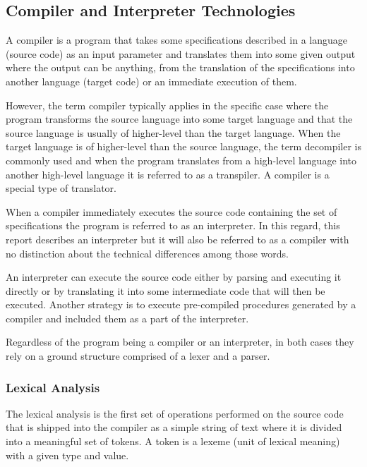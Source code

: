 \subsection{Compiler and Interpreter Technologies}

A compiler is a program that takes some specifications described in a language (source code) as an input parameter and translates them into some given output where the output can be anything, from the translation of the specifications into another language (target code) or an immediate execution of them.

However, the term compiler typically applies in the specific case where the program transforms the source language into some target language and that the source language is usually of higher-level than the target language. When the target language is of higher-level than the source language, the term decompiler is commonly used and when the program translates from a high-level language into another high-level language it is referred to as a transpiler. A compiler is a special type of translator.

When a compiler immediately executes the source code containing the set of specifications the program is referred to as an interpreter. In this regard, this report describes an interpreter but it will also be referred to as a compiler with no distinction about the technical differences among those words.

An interpreter can execute the source code either by parsing and executing it directly or by translating it into some intermediate code that will then be executed. Another strategy is to execute pre-compiled procedures generated by a compiler and included them as a part of the interpreter.

Regardless of the program being a compiler or an interpreter, in both cases they rely on a ground structure comprised of a lexer and a parser.

\subsubsection{Lexical Analysis}

The lexical analysis is the first set of operations performed on the source code that is shipped into the compiler as a simple string of text where it is divided into a meaningful set of tokens. A token is a lexeme (unit of lexical meaning) with a given type and value.


